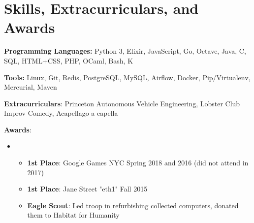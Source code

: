 \documentclass[11pt,letterpaper,sans]{moderncv}        %
\begin{document}




\vspace{-5pt}
\section{Skills, Extracurriculars, and Awards}

\textbf{Programming Languages:} Python 3, Elixir, JavaScript, Go, Octave, Java, C, SQL, HTML+CSS, PHP, OCaml, Bash, K

\textbf{Tools:} Linux, Git, Redis, PostgreSQL, MySQL, Airflow, Docker, Pip/Virtualenv, Mercurial, Maven

\textbf{Extracurriculars}: Princeton Autonomous Vehicle Engineering, Lobster Club Improv Comedy, Acapellago a capella

\textbf{Awards}:
\begin{itemize}
    \item[]\begin{itemize}

    \item{\textbf{1st Place}: Google Games NYC Spring 2018 and 2016 (did not attend in 2017)}
    \item{\textbf{1st Place}: Jane Street "eth1" Fall 2015}
    \item{\textbf{Eagle Scout}: Led troop in refurbishing collected computers, donated them to Habitat for Humanity}
    \end{itemize}
\end{itemize}


\nocite{*}



\end{document}
